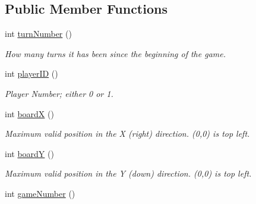 \subsection*{Public Member Functions}
\begin{DoxyCompactItemize}
\item 
\hypertarget{classBaseAI_a19ade7391bfe101884a35f48fb840199}{
int \hyperlink{classBaseAI_a19ade7391bfe101884a35f48fb840199}{turnNumber} ()}
\label{classBaseAI_a19ade7391bfe101884a35f48fb840199}

\begin{DoxyCompactList}\small\item\em How many turns it has been since the beginning of the game. \item\end{DoxyCompactList}\item 
\hypertarget{classBaseAI_a16aab1036653c8f8fb5370cf2f6a3e10}{
int \hyperlink{classBaseAI_a16aab1036653c8f8fb5370cf2f6a3e10}{playerID} ()}
\label{classBaseAI_a16aab1036653c8f8fb5370cf2f6a3e10}

\begin{DoxyCompactList}\small\item\em Player Number; either 0 or 1. \item\end{DoxyCompactList}\item 
\hypertarget{classBaseAI_a298c9ca7f754329796f45e38383c2c0a}{
int \hyperlink{classBaseAI_a298c9ca7f754329796f45e38383c2c0a}{boardX} ()}
\label{classBaseAI_a298c9ca7f754329796f45e38383c2c0a}

\begin{DoxyCompactList}\small\item\em Maximum valid position in the X (right) direction. (0,0) is top left. \item\end{DoxyCompactList}\item 
\hypertarget{classBaseAI_aaf123aaebe77eeda93c3d78d5783f541}{
int \hyperlink{classBaseAI_aaf123aaebe77eeda93c3d78d5783f541}{boardY} ()}
\label{classBaseAI_aaf123aaebe77eeda93c3d78d5783f541}

\begin{DoxyCompactList}\small\item\em Maximum valid position in the Y (down) direction. (0,0) is top left. \item\end{DoxyCompactList}\item 
\hypertarget{classBaseAI_a50d3091db33b93c6f7c2d11dd64b4c7a}{
int \hyperlink{classBaseAI_a50d3091db33b93c6f7c2d11dd64b4c7a}{gameNumber} ()}
\label{classBaseAI_a50d3091db33b93c6f7c2d11dd64b4c7a}


\end{DoxyCompactItemize}

